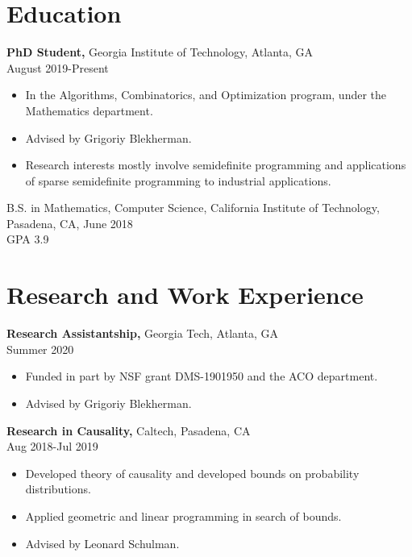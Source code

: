 \documentclass[margin]{res}
\begin{document}
 
 
 
\address{{\bf Present Address} \\ 1737 Liberty Parkway NW \\ Atlanta, GA 30318  \\
        (626) 399-3716 }
\address{{\bf Permanent Address} \\ 84 Cheesespring Road \\ Wilton, CT 06897}

 
\begin{resume} 

\section{Education} 
 {\bf PhD Student,} Georgia Institute of Technology, Atlanta, GA\\ August 2019-Present
 \begin{itemize} \itemsep -2pt  %
 \item In the Algorithms, Combinatorics, and Optimization program, under the Mathematics department.
 \item Advised by Grigoriy Blekherman.
 \item Research interests mostly involve semidefinite programming and applications of sparse semidefinite programming to industrial applications.
 \end{itemize}

B.S. in Mathematics, Computer Science, California Institute of Technology, Pasadena, CA, June 2018 \\
GPA 3.9

\section{Research and Work Experience}
{\bf Research Assistantship,} Georgia Tech, Atlanta, GA \\ Summer 2020
\begin{itemize} \itemsep -2pt %
\item Funded in part by NSF grant DMS-1901950 and the ACO department.
\item Advised by Grigoriy Blekherman.
\end{itemize}
 
{\bf Research in Causality,} Caltech, Pasadena, CA \\ Aug 2018-Jul 2019
\begin{itemize} \itemsep -2pt %
\item Developed theory of causality and developed bounds on probability distributions.
\item Applied geometric and linear programming in search of bounds.
\item Advised by Leonard Schulman.
\end{itemize}
 

\end{resume}
\end{document}

